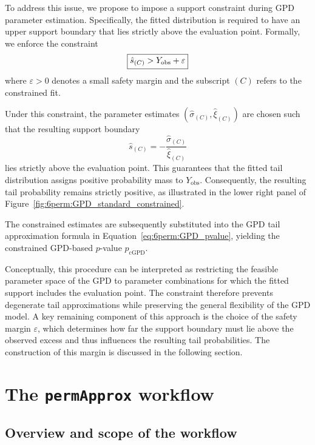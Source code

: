 To address this issue, we propose to impose a support constraint during GPD parameter estimation. Specifically, the fitted distribution is required to have an upper support boundary that lies strictly above the evaluation point. 
Formally, we enforce the constraint
\begin{equation}
\fbox{$\displaystyle
\hat{s}_{(C)} > Y_{\mathrm{obs}} + \varepsilon
$}
\end{equation}
where $\varepsilon > 0$ denotes a small safety margin and the subscript $(C)$ refers to the constrained fit.

Under this constraint, the parameter estimates $(\hat{\sigma}_{(C)},\hat{\xi}_{(C)})$ are chosen such that the resulting support boundary
\[
\hat{s}_{(C)} = -\frac{\hat{\sigma}_{(C)}}{\hat{\xi}_{(C)}}
\]
lies strictly above the evaluation point. 
This guarantees that the fitted tail distribution assigns positive probability mass to $Y_{\mathrm{obs}}$. 
Consequently, the resulting tail probability remains strictly positive, as illustrated in the lower right panel of Figure~\ref{fig:6perm:GPD_standard_constrained}.

The constrained estimates are subsequently substituted into the GPD tail approximation formula in Equation~\eqref{eq:6perm:GPD_pvalue}, yielding the constrained GPD-based $p$-value $p_{\mathrm{cGPD}}$.

Conceptually, this procedure can be interpreted as restricting the feasible parameter space of the GPD to parameter combinations for which the fitted support includes the evaluation point. 
The constraint therefore prevents degenerate tail approximations while preserving the general flexibility of the GPD model. 
A key remaining component of this approach is the choice of the safety margin $\varepsilon$, which determines how far the support boundary must lie above the observed excess and thus influences the resulting tail probabilities. The construction of this margin is discussed in the following section.

\section{The \texttt{permApprox} workflow}
\label{sec:6perm:workflow}

\subsection{Overview and scope of the workflow}
\label{sec:6perm:workflow:overview}

